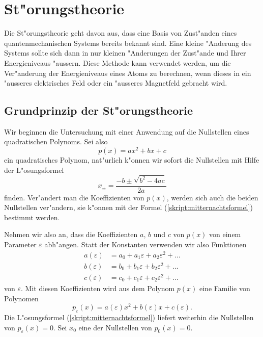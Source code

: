 \chapter{St"orungstheorie}
\rhead{}
Die St"orungstheorie geht davon aus, dass eine Basis von Zust"anden eines
quantenmechanischen Systems bereits bekannt sind. Eine kleine
"Anderung des Systems sollte sich dann in nur kleinen "Anderungen
der Zust"ande und Ihrer Energieniveaus "aussern.
Diese Methode kann verwendet werden, um die Ver"anderung der Energieniveaus
eines Atoms zu berechnen, wenn dieses in ein "ausseres elektrisches Feld
oder ein "ausseres Magnetfeld gebracht wird.

\section{Grundprinzip der St"orungstheorie}
Wir beginnen die Untersuchung mit einer Anwendung auf die Nullstellen
eines quadratischen Polynoms. Sei also
\[
p(x) = ax^2 + bx + c
\]
ein quadratisches Polynom, nat"urlich k"onnen wir sofort die Nullstellen
mit Hilfe der L"osungsformel
\begin{equation}
x_{\pm}=\frac{-b\pm\sqrt{b^2-4ac}}{2a}
\label{skript:mitternachtsformel}
\end{equation}
finden.  Ver"andert man die Koeffizienten von $p(x)$, werden sich auch
die beiden Nullstellen ver"andern, sie k"onnen mit der Formel
(\ref{skript:mitternachtsformel}) bestimmt werden.

Nehmen wir also an, dass die Koeffizienten $a$, $b$ und $c$ von $p(x)$
von einem Parameter $\varepsilon$ abh"angen. Statt der Konstanten verwenden
wir also Funktionen
\begin{align*}
a(\varepsilon)&=a_0+a_1\varepsilon+a_2\varepsilon^2+\dots\\
b(\varepsilon)&=b_0+b_1\varepsilon+b_2\varepsilon^2+\dots\\
c(\varepsilon)&=c_0+c_1\varepsilon+c_2\varepsilon^2+\dots
\end{align*}
von $\varepsilon$. Mit diesen Koeffizienten wird aus dem Polynom $p(x)$
eine Familie von Polynomen
\[
p_\varepsilon(x)=a(\varepsilon)x^2 + b(\varepsilon)x+c(\varepsilon).
\]
Die L"osungsformel (\ref{skript:mitternachtsformel}) liefert weiterhin die
Nullstellen von $p_{\varepsilon}(x)=0$.
Sei $x_0$ eine der Nullstellen von $p_0(x) = 0$.

